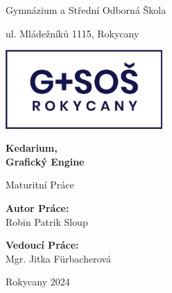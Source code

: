 \begin{titlepage}
    \begin{center}
        {\Large Gymnázium a Střední Odborná Škola\par}
        ul. Mládežníků 1115, Rokycany
    \end{center}
    \begin{center}
        \vspace{1cm}
        \includegraphics[height=3cm]{images/school-logo.png}\\
    \end{center}
    \vspace*{\fill}
    \begin{center} 
        {\Huge \textbf{Kedarium,\\Grafický Engine}\par}
        \vspace{0.3cm}
        {\Large Maturitní Práce\par}
        \vspace{1.5cm}
    \end{center}
    \vspace*{\fill}
    \begin{center}
        \begin{minipage}[t]{0.45\textwidth}
            \centering
            \textbf{Autor Práce:}\\
            Robin Patrik Sloup
        \end{minipage}%
        \begin{minipage}[t]{0.45\textwidth}
            \centering
            \textbf{Vedoucí Práce:}\\
            Mgr. Jitka Fürbacherová
        \end{minipage}
    \end{center}
    \vspace{2cm}
    \begin{center}
        Rokycany 2024
    \end{center}\textbf{}
    \thispagestyle{empty}
\end{titlepage}
